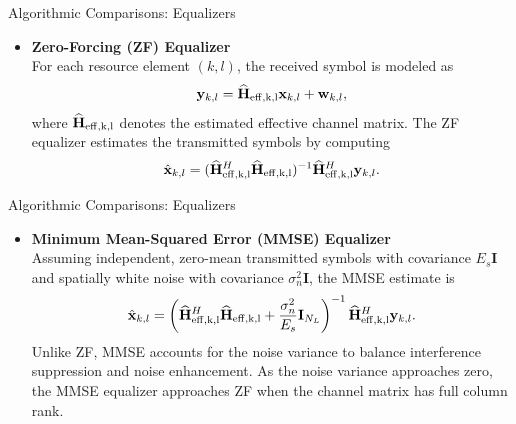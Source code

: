 \documentclass[xcolor=dvipsnames,12pt]{beamer}
\begin{document}
\begin{frame}{Algorithmic Comparisons: Equalizers}
    \begin{footnotesize}
        \begin{itemize}
            \item[1.] \textbf{Zero-Forcing (ZF) Equalizer} \\

            For each resource element $(k,l)$, the received symbol is modeled as
            \begin{equation}
                {\bf y}_{k,l} = {\widehat{{\bf H}}}_{\rm{eff},k,l} {\bf x}_{k,l} + {\bf w}_{k,l},
            \end{equation}
            where ${\widehat{{\bf H}}}_{\rm{eff},k,l}$ denotes the estimated effective channel matrix.  The ZF equalizer estimates the transmitted symbols by computing
            \begin{equation}
                \hat{{\bf x}}_{k,l} = ({\widehat{{\bf H}}}_{\rm{eff},k,l}^H {\widehat{{\bf H}}}_{\rm{eff},k,l})^{-1} {\widehat{{\bf H}}}_{\rm{eff},k,l}^H {\bf y}_{k,l}.
            \end{equation}
            
        \end{itemize}
    \end{footnotesize}
\end{frame}

\begin{frame}{Algorithmic Comparisons: Equalizers}
    \begin{footnotesize}
        \begin{itemize}
            \item[2.] \textbf{Minimum Mean-Squared Error (MMSE) Equalizer} \\

            Assuming independent, zero-mean transmitted symbols with covariance $E_s\mathbf{I}$ and spatially white noise with covariance $\sigma_n^2\mathbf{I}$, the MMSE estimate is
            \begin{equation}
                \hat{{\bf x}}_{k,l} = \left( {\widehat{{\bf H}}}_{\rm{eff},k,l}^H {\widehat{{\bf H}}}_{\rm{eff},k,l} + \frac{\sigma_n^2}{E_s}\mathbf{I}_{N_L} \right)^{-1} {\widehat{{\bf H}}}_{\rm{eff},k,l}^H {\bf y}_{k,l}.
            \end{equation}
            Unlike ZF, MMSE accounts for the noise variance to balance interference suppression and noise enhancement.  As the noise variance approaches zero, the MMSE equalizer approaches ZF when the channel matrix has full column rank.
        \end{itemize}
    \end{footnotesize}
\end{frame}
\end{document}
